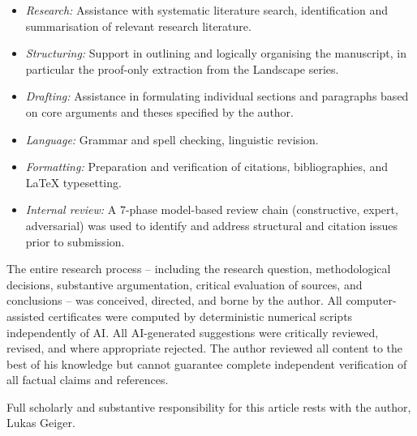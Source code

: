 \documentclass[11pt,a4paper]{article}
\theoremstyle{remark}
\theoremstyle{plain}
\begin{document}
\begin{itemize}[leftmargin=*,itemsep=1pt,topsep=2pt,parsep=0pt]
  \item \textit{Research:} Assistance with systematic literature search,
        identification and summarisation of relevant research literature.
  \item \textit{Structuring:} Support in outlining and logically organising
        the manuscript, in particular the proof-only extraction from the
        Landscape series.
  \item \textit{Drafting:} Assistance in formulating individual sections
        and paragraphs based on core arguments and theses specified by
        the author.
  \item \textit{Language:} Grammar and spell checking, linguistic revision.
  \item \textit{Formatting:} Preparation and verification of citations,
        bibliographies, and \LaTeX{} typesetting.
  \item \textit{Internal review:} A 7-phase model-based review chain
        (constructive, expert, adversarial) was used to identify and
        address structural and citation issues prior to submission.
\end{itemize}

\noindent
The entire research process -- including the research question, methodological
decisions, substantive argumentation, critical evaluation of sources, and
conclusions -- was conceived, directed, and borne by the author. All
computer-assisted certificates were computed by deterministic numerical
scripts independently of AI. All AI-generated suggestions were critically
reviewed, revised, and where appropriate rejected. The author reviewed all
content to the best of his knowledge but cannot guarantee complete
independent verification of all factual claims and references.

\smallskip

\noindent
Full scholarly and substantive responsibility for this article rests with
the author, Lukas Geiger.

\normalsize



\end{document}
